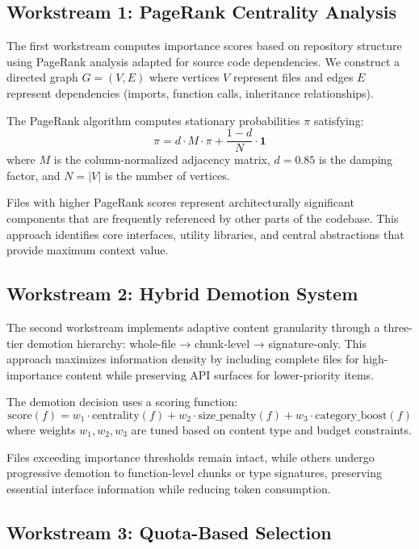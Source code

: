 \documentclass[conference]{IEEEtran}
\begin{document}
\subsection{Workstream 1: PageRank Centrality Analysis}

The first workstream computes importance scores based on repository structure using PageRank analysis adapted for source code dependencies. We construct a directed graph $G = (V, E)$ where vertices $V$ represent files and edges $E$ represent dependencies (imports, function calls, inheritance relationships).

The PageRank algorithm computes stationary probabilities $\pi$ satisfying:
\begin{equation}
\pi = d \cdot M \cdot \pi + \frac{1-d}{N} \cdot \mathbf{1}
\end{equation}
where $M$ is the column-normalized adjacency matrix, $d = 0.85$ is the damping factor, and $N = |V|$ is the number of vertices.

Files with higher PageRank scores represent architecturally significant components that are frequently referenced by other parts of the codebase. This approach identifies core interfaces, utility libraries, and central abstractions that provide maximum context value.

\subsection{Workstream 2: Hybrid Demotion System}

The second workstream implements adaptive content granularity through a three-tier demotion hierarchy: whole-file → chunk-level → signature-only. This approach maximizes information density by including complete files for high-importance content while preserving API surfaces for lower-priority items.

The demotion decision uses a scoring function:
\begin{equation}
\text{score}(f) = w_1 \cdot \text{centrality}(f) + w_2 \cdot \text{size\_penalty}(f) + w_3 \cdot \text{category\_boost}(f)
\end{equation}
where weights $w_1, w_2, w_3$ are tuned based on content type and budget constraints.

Files exceeding importance thresholds remain intact, while others undergo progressive demotion to function-level chunks or type signatures, preserving essential interface information while reducing token consumption.

\subsection{Workstream 3: Quota-Based Selection}
\end{document}
